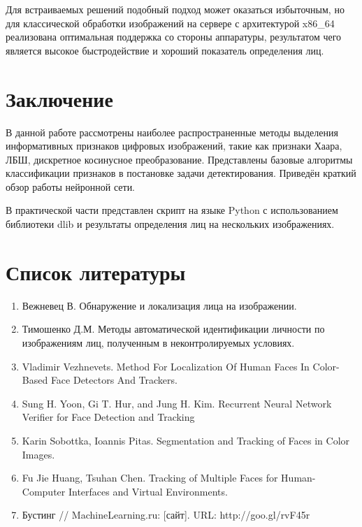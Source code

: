 \documentclass[a4paper, 14pt]{extarticle}	%
\begin{document}
Для встраиваемых решений подобный подход может оказаться избыточным, но для классической обработки изображений на сервере с архитектурой x86\_64 реализована оптимальная поддержка со стороны аппаратуры, результатом чего является высокое быстродействие и хороший показатель определения лиц.



\newpage
\section*{Заключение}

В данной работе рассмотрены наиболее распространенные методы выделения информативных признаков цифровых изображений, такие как признаки Хаара, ЛБШ, дискретное косинусное преобразование. Представлены базовые алгоритмы классификации признаков в постановке задачи детектирования. Приведён краткий обзор работы нейронной сети.

В практической части представлен скрипт на языке Python с использованием библиотеки dlib и результаты определения лиц на нескольких изображениях.


\newpage
\section*{Список литературы}

\begin{enumerate}
\item Вежневец В. Обнаружение и локализация лица на изображении.
\item Тимошенко Д.М. Методы автоматической идентификации личности по изображениям лиц, полученным в неконтролируемых условиях.
\item Vladimir Vezhnevets. Method For Localization Of Human Faces In Color-Based Face Detectors And Trackers.
\item Sung H. Yoon, Gi T. Hur, and Jung H. Kim. Recurrent Neural Network Verifier for Face Detection and Tracking
\item Karin Sobottka, Ioannis Pitas. Segmentation and Tracking of Faces in Color Images.
\item Fu Jie Huang, Tsuhan Chen. Tracking of Multiple Faces for Human-Computer Interfaces and Virtual Environments.
\item Бустинг // MachineLearning.ru: [сайт]. URL: http://goo.gl/rvF45r
\end{enumerate}
\end{document}
